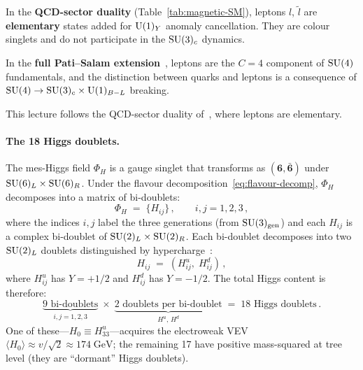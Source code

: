 \documentclass[11pt,a4paper]{article}
\begin{document}
\begin{warningbox}[title={Leptons in the QCD dual vs.\ Pati--Salam}]
  In the \textbf{QCD-sector duality} (Table~\ref{tab:magnetic-SM}),
  leptons $l$, $\widetilde{l}$ are \textbf{elementary}
  states added for $\mathrm{U}(1)_Y$ anomaly cancellation.  They are colour
  singlets and do not participate in the $\mathrm{SU}(3)_c$ dynamics.

  In the \textbf{full Pati--Salam extension}~\cite{Sannino2011},
  leptons are the $C = 4$ component of $\mathrm{SU}(4)$ fundamentals, and the
  distinction between quarks and leptons is a consequence of
  $\mathrm{SU}(4) \to \mathrm{SU}(3)_c \times \mathrm{U}(1)_{B-L}$ breaking.

  This lecture follows the QCD-sector duality of~\cite{CacciapagliaSannino2024}, where leptons are elementary.
\end{warningbox}

\paragraph{The 18 Higgs doublets.}
The mes-Higgs field $\Phi_H$ is a gauge singlet that transforms as
$(\mathbf{6}, \bar{\mathbf{6}})$ under $\mathrm{SU}(6)_L \times \mathrm{SU}(6)_R$.
Under the flavour decomposition~\eqref{eq:flavour-decomp}, $\Phi_H$
decomposes into a matrix of bi-doublets:
\begin{equation}\label{eq:Phi-H}
  \Phi_H \;=\; \{H_{ij}\}\,,
  \qquad i,j = 1,2,3\,,
\end{equation}
where the indices $i,j$ label the three generations
(from $\mathrm{SU}(3)_{\mathrm{gen}}$) and each $H_{ij}$ is a complex bi-doublet
of $\mathrm{SU}(2)_L \times \mathrm{SU}(2)_R$.  Each bi-doublet decomposes into two
$\mathrm{SU}(2)_L$ doublets distinguished by hypercharge~\cite{CacciapagliaSannino2024}:
\begin{equation}\label{eq:Higgs-decomp}
  H_{ij} \;=\; (H_{ij}^u,\; H_{ij}^d)\,,
\end{equation}
where $H_{ij}^u$ has $Y = +1/2$ and $H_{ij}^d$ has $Y = -1/2$.
The total Higgs content is therefore:
\begin{equation}\label{eq:18-Higgs}
  \underbrace{9 \text{ bi-doublets}}_{i,j = 1,2,3}
  \;\times\;
  \underbrace{2 \text{ doublets per bi-doublet}}_{H^u,\, H^d}
  \;=\; \boxed{18 \text{ Higgs doublets}\,.}
\end{equation}
One of these---$H_0 \equiv H_{33}^u$---acquires the
electroweak VEV $\langle H_0 \rangle \approx v/\sqrt{2} \approx
174\;\text{GeV}$; the remaining 17 have
positive mass-squared at tree level (they are ``dormant'' Higgs
doublets).
\end{document}

